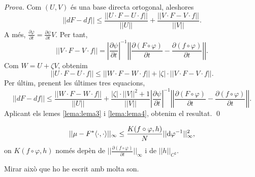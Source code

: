 {\color{green!50!black}
\textit{Prova.} Com $(U,V)$ és una base directa ortogonal, aleshores 
\begin{equation*}
    ||dF-df||\le \frac{||U\cdot F - U\cdot f||}{||U||} + \frac{||V\cdot F - V\cdot f||}{||V||}.
\end{equation*}
A més, $\frac{\partial \varphi}{\partial t} = \frac{\partial \psi}{\partial t}V$. Per tant,
\begin{equation}\label{eq: dospuntonze}
    ||V\cdot F - V\cdot f|| = \left|\frac{\partial\psi}{\partial t}\right|^{-1} \left|\left| \frac{\partial(F\circ\varphi)}{\partial t} - \frac{\partial(f\circ\varphi)}{\partial t} \right|\right|.
\end{equation}
Com $W=U+\zeta V$, obtenim
\begin{equation*}
    ||U\cdot F - U\cdot f|| \le ||W\cdot F - W\cdot f|| + |\zeta |\cdot||V\cdot F - V\cdot f||.
\end{equation*}
Per últim, prenent les últimes tres equacions,
\begin{equation}\label{eq:demo lema 6}
    ||dF-df||\le \frac{||W\cdot F - W\cdot f||}{||U||} + \frac{|\zeta|\cdot||V||^2+1}{||V||}\left|\frac{\partial\psi}{\partial t}\right|^{-1} \left|\left| \frac{\partial(F\circ\varphi)}{\partial t} - \frac{\partial(f\circ\varphi)}{\partial t} \right|\right|.
\end{equation}
Aplicant els lemes \ref{lema:lema3} i \ref{lema:lema4}, obtenim el resultat. \qed
}
\begin{lema}
    \label{lema:lema7}
    \begin{equation*}
        ||\mu-F^*\langle\cdot, \cdot\rangle||_\infty \le \frac{K(f\circ\varphi,h)}{N}||\textrm d\varphi ^{-1}||_\infty^2,
    \end{equation*}
    on $K(f\circ\varphi,h)$ només depèn de $||\frac{\partial(f\circ\varphi)}{\partial t}||_\infty$ i de $||h||_{C^2}$.
\end{lema}
{\color{blue} Mirar això que ho he escrit amb molta son.}


